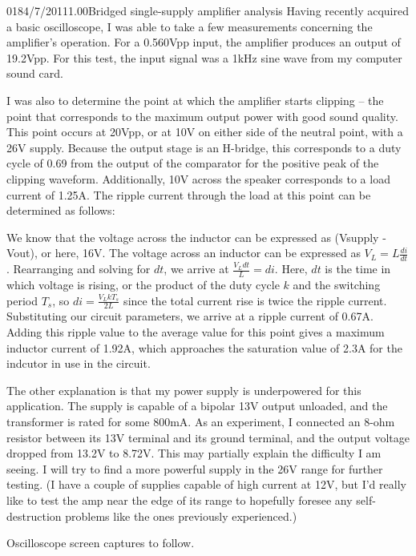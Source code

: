 \documentclass[12pt,letterpaper,onecolumn]{article}
\begin{document}
\begin{nbentry}{018}{4/7/2011}{1.00}{Bridged single-supply amplifier analysis}
Having recently acquired a basic oscilloscope, I was able to take a few measurements concerning the amplifier's operation.  For a 0.560Vpp input, the amplifier produces an output of 19.2Vpp.  For this test, the input signal was a 1kHz sine wave from my computer sound card.

I was also to determine the point at which the amplifier starts clipping -- the point that corresponds to the maximum output power with good sound quality.  This point occurs at 20Vpp, or at 10V on either side of the neutral point, with a 26V supply.  Because the output stage is an H-bridge, this corresponds to a duty cycle of 0.69 from the output of the comparator for the positive peak of the clipping waveform.  Additionally, 10V across the speaker corresponds to a load current of 1.25A.  The ripple current through the load at this point can be determined as follows:  

We know that the voltage across the inductor can be expressed as (Vsupply - Vout), or here, 16V.  The voltage across an inductor can be expressed as 
\(
V_L = L \frac{di}{dt}
\).  Rearranging and solving for \(dt\), we arrive at 
\( \frac{V_L dt}{L} = di\).  Here, \(dt\) is the time in which voltage is rising, or the product of the duty cycle \(k\) and the switching period \(T_s\), so \(di = \frac{V_L kT_s}{2L}\) since the total current rise is twice the ripple current.  Substituting our circuit parameters, we arrive at a ripple current of 0.67A.  Adding this ripple value to the average value for this point gives a maximum inductor current of 1.92A, which approaches the saturation value of 2.3A for the indcutor in use in the circuit.

The other explanation is that my power supply is underpowered for this application.  The supply is capable of a bipolar 13V output unloaded, and the transformer is rated for some 800mA.  As an experiment, I connected an 8-ohm resistor between its 13V terminal and its ground terminal, and the output voltage dropped from 13.2V to 8.72V.  This may partially explain the difficulty I am seeing.  I will try to find a more powerful supply in the 26V range for further testing.  (I have a couple of supplies capable of high current at 12V, but I'd really like to test the amp near the edge of its range to hopefully foresee any self-destruction problems like the ones previously experienced.)

Oscilloscope screen captures to follow.
\end{nbentry}
\end{document}
